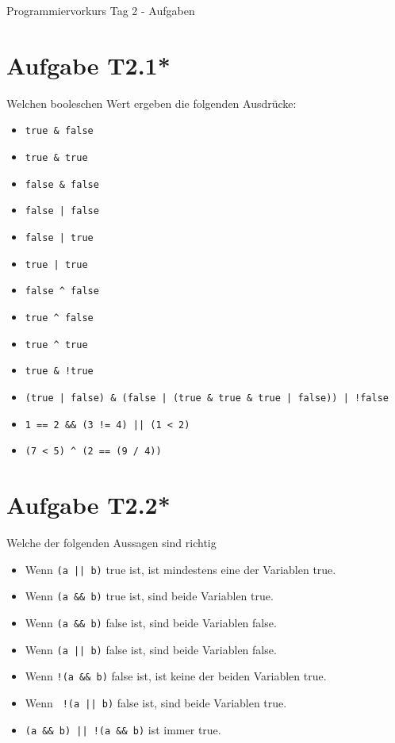 \documentclass[final,a4paper]{article}
\begin{document}


{\huge Programmiervorkurs Tag 2 - Aufgaben}

\bigskip

\section*{Aufgabe T2.1*}
	Welchen booleschen Wert ergeben die folgenden Ausdrücke:
	\begin{itemize}
		\item \lstinline{true & false}
		\item \lstinline{true & true}
		\item \lstinline{false & false}
		\item \lstinline{false | false}
		\item \lstinline{false | true}
		\item \lstinline{true | true}
		\item \lstinline{false ^ false}
		\item \lstinline{true ^ false}
		\item \lstinline{true ^ true}
		\item \lstinline{true & !true}
		\item \lstinline{(true | false) & (false | (true & true & true | false)) | !false}
		\item \lstinline{1 == 2 && (3 != 4) || (1 < 2)}
		\item \lstinline{(7 < 5) ^ (2 == (9 / 4))}
	\end{itemize}


\section*{Aufgabe T2.2*}
Welche der folgenden Aussagen sind richtig
\begin{itemize}
\item Wenn \lstinline{(a || b)} true ist, ist mindestens eine der Variablen true.
\item Wenn \lstinline{(a && b)} true ist, sind beide Variablen true.
\item Wenn \lstinline{(a && b)} false ist, sind beide Variablen false.
\item Wenn \lstinline{(a || b)} false ist, sind beide Variablen false.
\item Wenn \lstinline{!(a && b)} false ist, ist keine der beiden Variablen true.
\item Wenn \lstinline{ !(a || b)} false ist, sind beide Variablen true.
\item \lstinline{(a && b) || !(a && b)} ist immer true.
\end{itemize}
\end{document}
